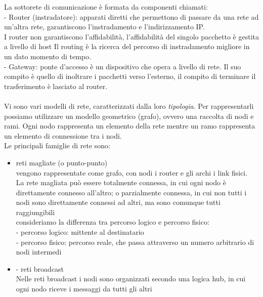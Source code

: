 \documentclass[11pt, oneside]{article}   	%
\begin{document}
La sottorete di comunicazione è formata da componenti chiamati:\\
- Router (instradatore): apparati diretti che permettono di passare da una rete ad un’altra rete, garantiscono l'instradamento e l'indirizzamento IP.\\
I router non garantiscono l'affidabilità, l'affidabilità del singolo pacchetto è gestita a livello di host
Il routing è la ricerca del percorso di instradamento migliore in un dato momento di tempo.\\
- Gateway: ponte d'accesso è un dispositivo che opera a livello di rete. Il suo compito è quello di inoltrare i pacchetti verso l'esterno, il compito di terminare il trasferimento è lasciato al router.\\\\
Vi sono vari modelli di rete, caratterizzati dalla loro \emph{tipologia}. Per rappresentarli possiamo utilizzare un modello geometrico (grafo), ovvero una raccolta di nodi e rami. Ogni nodo rappresenta un elemento della rete mentre un ramo rappresenta un elemento di connessione tra i nodi.\\
Le principali famiglie di rete sono:
\begin{itemize}
\item reti magliate (o punto-punto)\\
vengono rappresentate come grafo, con nodi i router e gli archi i link fisici.\\
La rete magliata può essere totalmente connessa, in cui ogni nodo è direttamente connesso all'altro; o parzialmente connessa, in cui non tutti i nodi sono direttamente connessi ad altri, ma sono comunque tutti raggiungibili\\
{\footnotesize consideriamo la differenza tra percorso logico e percorso fisico:\\
- percorso logico: mittente al destinatario\\
- percorso fisico: percorso reale, che passa attraverso un numero arbitrario di nodi intermedi}
\item - reti broadcast\\
Nelle reti broadcast i nodi sono organizzati secondo una logica hub, in cui ogni nodo riceve i messaggi da tutti gli altri
\end{itemize}
\end{document}
